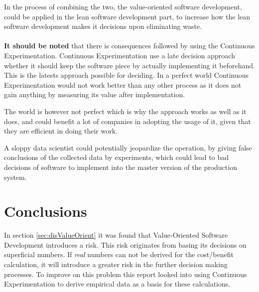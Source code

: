 \documentclass{sig-alternate}
\begin{document}
In the process of combining the two, the value-oriented software development, could be applied in the lean
software development part, to increase how the lean software development makes it decisions upon eliminating 
waste.
\\
\\
\textbf{It should be noted} that there is consequences followed by using the Continuous Experimentation. 
Continuous Experimentation use a late decision approach whether it should keep the software piece by 
actually implementing it beforehand. 
This is the latests approach possible for deciding. In a perfect world Continuous Experimentation would not
work better than any other process as it does not gain anything by measuring its value after implementation.

The world is however not perfect which is why the approach works as well as it does, and could benefit 
a lot of companies in adopting the usage of it, given that they are efficient in doing their work. 

A sloppy data scientist could potentially jeopardize the operation, by giving false conclusions of the 
collected data by experiments, which could lead to bad decisions of software to implement into the master
version of the production system.

\section{Conclusions}


In section \ref{sec:disValueOrient} it was found that Value-Oriented Software Development introduces a risk. This risk originates from basing its decisions on superficial numbers. If \textit{real} numbers can not be derived for the cost/benefit calculation, it will introduce a greater risk in the further decision making processes. To improve on this problem this report looked into using Continuous Experimentation to derive empirical data as a basis for these calculations. 
\end{document}
